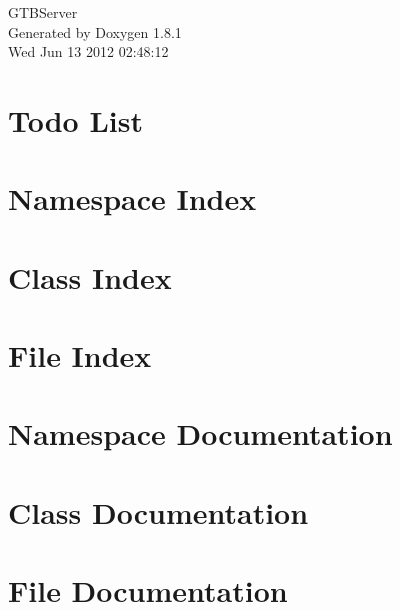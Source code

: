 \documentclass{book}
\begin{document}
\hypersetup{pageanchor=false,citecolor=blue}
\begin{titlepage}
\vspace*{7cm}
\begin{center}
{\Large G\-T\-B\-Server }\\
\vspace*{1cm}
{\large Generated by Doxygen 1.8.1}\\
\vspace*{0.5cm}
{\small Wed Jun 13 2012 02:48:12}\\
\end{center}
\end{titlepage}
\clearemptydoublepage
{}
\tableofcontents
\clearemptydoublepage
{}
\hypersetup{pageanchor=true,citecolor=blue}
\chapter{Todo List}
\label{todo}
\hypertarget{todo}{}

\chapter{Namespace Index}

\chapter{Class Index}

\chapter{File Index}

\chapter{Namespace Documentation}


\chapter{Class Documentation}











\chapter{File Documentation}










\printindex
\end{document}
